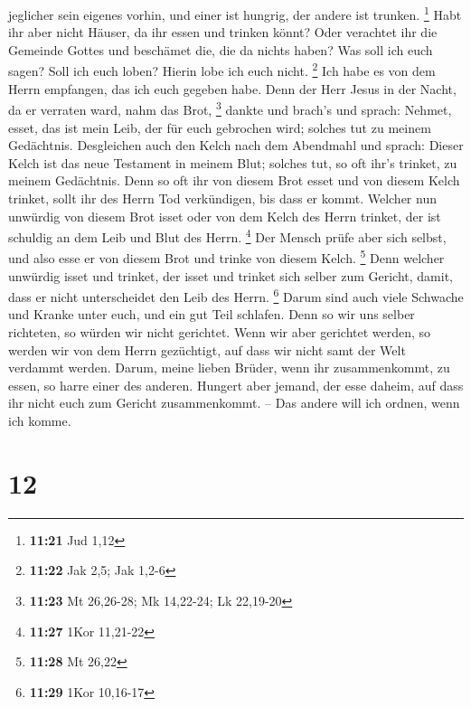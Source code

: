 jeglicher sein eigenes vorhin, und einer ist hungrig, der andere ist
trunken. \footnote{\textbf{11:21} Jud 1,12}  Habt ihr
aber nicht Häuser, da ihr essen und trinken könnt? Oder verachtet ihr
die Gemeinde Gottes und beschämet die, die da nichts haben? Was soll ich
euch sagen? Soll ich euch loben? Hierin lobe ich euch nicht. \footnote{\textbf{11:22}
  Jak 2,5; Jak 1,2-6}  Ich habe es von dem Herrn
empfangen, das ich euch gegeben habe. Denn der Herr Jesus in der Nacht,
da er verraten ward, nahm das Brot, \footnote{\textbf{11:23} Mt
  26,26-28; Mk 14,22-24; Lk 22,19-20}  dankte und brach's
und sprach: Nehmet, esset, das ist mein Leib, der für euch gebrochen
wird; solches tut zu meinem Gedächtnis.  Desgleichen auch
den Kelch nach dem Abendmahl und sprach: Dieser Kelch ist das neue
Testament in meinem Blut; solches tut, so oft ihr's trinket, zu meinem
Gedächtnis.  Denn so oft ihr von diesem Brot esset und
von diesem Kelch trinket, sollt ihr des Herrn Tod verkündigen, bis dass
er kommt.  Welcher nun unwürdig von diesem Brot isset
oder von dem Kelch des Herrn trinket, der ist schuldig an dem Leib und
Blut des Herrn. \footnote{\textbf{11:27} 1Kor 11,21-22} 
Der Mensch prüfe aber sich selbst, und also esse er von diesem Brot und
trinke von diesem Kelch. \footnote{\textbf{11:28} Mt 26,22}
 Denn welcher unwürdig isset und trinket, der isset und
trinket sich selber zum Gericht, damit, dass er nicht unterscheidet den
Leib des Herrn. \footnote{\textbf{11:29} 1Kor 10,16-17} 
Darum sind auch viele Schwache und Kranke unter euch, und ein gut Teil
schlafen.  Denn so wir uns selber richteten, so würden
wir nicht gerichtet.  Wenn wir aber gerichtet werden, so
werden wir von dem Herrn gezüchtigt, auf dass wir nicht samt der Welt
verdammt werden.  Darum, meine lieben Brüder, wenn ihr
zusammenkommt, zu essen, so harre einer des anderen. 
Hungert aber jemand, der esse daheim, auf dass ihr nicht euch zum
Gericht zusammenkommt. -- Das andere will ich ordnen, wenn ich komme.

\hypertarget{section-11}{%
\section{12}\label{section-11}}

